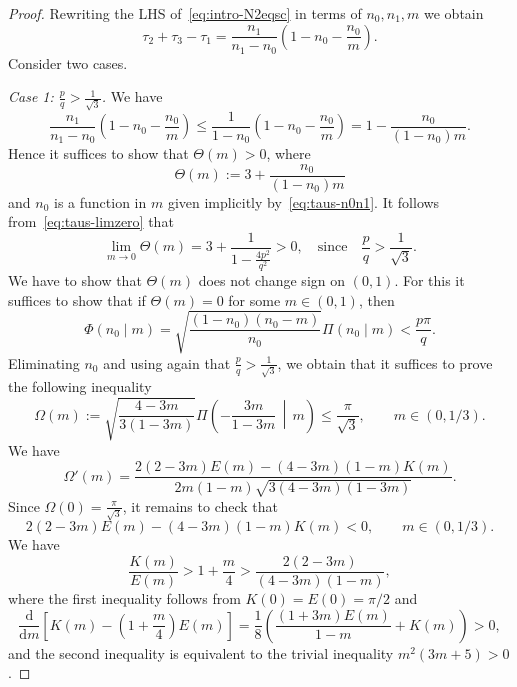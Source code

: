 \documentclass[10pt,a4paper]{amsart}
\newcommand{\bigmid}{\,\middle\vert\,}
\renewcommand{\d}{\mathrm{d}}
\begin{document}
\begin{proof}
Rewriting the LHS of~\eqref{eq:intro-N2eqsc} in terms of \(n_0,n_1,m\) we obtain
\[
\tau_2+\tau_3-\tau_1=\frac{n_1}{n_1-n_0}\left(1-n_0-\frac{n_0}m\right).
\]
Consider two cases.

\textit{Case 1: \(\frac{p}q>\frac{1}{\sqrt 3}\).} We have
\[
\frac{n_1}{n_1-n_0}\left(1-n_0-\frac{n_0}m\right)\le
\frac{1}{1-n_0}\left(1-n_0-\frac{n_0}m\right)=
1-\frac{n_0}{(1-n_0)m}.
\]
Hence it suffices to show that \(\Theta(m)>0\), where
\[
\Theta(m):=3+\frac{n_0}{(1-n_0)m}
\]
and \(n_0\) is a function in \(m\) given implicitly by~\eqref{eq:taus-n0n1}. It
follows from~\eqref{eq:taus-limzero} that
\[
\lim_{m\to 0}\Theta(m)=3+\frac{1}{1-\frac{4p^2}{q^2}}>0,\quad\text{since}\quad
\frac{p}q>\frac{1}{\sqrt 3}.
\]
We have to show that \(\Theta(m)\) does not change sign on \((0,1)\). For this
it suffices to show that if \(\Theta(m)=0\) for some \(m\in (0,1)\), then
\[
\Phi(n_0\mid m)=\sqrt{\frac{(1-n_0)(n_0-m)}{n_0}}\Pi(n_0\mid m)<\frac{p\pi}q.
\]
Eliminating \(n_0\) and using again that \(\frac{p}q>\frac{1}{\sqrt 3}\), we
obtain that it suffices to prove the following inequality
\[
\Omega(m):=\sqrt{\frac{4-3m}{3(1-3m)}}\Pi\left(-\frac{3m}{1-3m}\bigmid
m\right)\le\frac{\pi}{\sqrt 3},\qquad m\in (0,1/3).
\]
We have
\[
\Omega'(m)=\frac{2(2-3m)E(m)-(4-3m)(1-m)K(m)}{2m(1-m)\sqrt{3(4-3m)(1-3m)}}.
\]
Since \(\Omega(0)=\frac{\pi}{\sqrt 3}\), it remains to check that
\[
2(2-3m)E(m)-(4-3m)(1-m)K(m)<0,\qquad m\in (0,1/3).
\]
We have
\[
\frac{K(m)}{E(m)}>1+\frac{m}4>\frac{2(2-3m)}{(4-3m)(1-m)},
\]
where the first inequality follows from \(K(0)=E(0)=\pi/2\) and
\[
\frac{\d}{\d m}\left[K(m)-\left(1+\frac{m}4\right)E(m)\right]=
\frac{1}8\left(\frac{(1+3m)E(m)}{1-m}+K(m)\right)>0,
\]
and the second inequality is equivalent to the trivial inequality
\(m^2(3m+5)>0\).


\end{proof}
\end{document}
